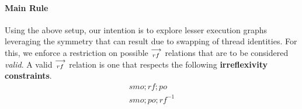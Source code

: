     \paragraph{Main Rule}
        Using the above setup, our intention is to explore lesser execution graphs leveraging the symmetry that can result due to swapping of thread identities. For this, we enforce a restriction on possible $\stackrel{\longrightarrow}{_{rf}}$ relations that are to be considered \emph{valid}. A valid $\stackrel{\longrightarrow}{_{rf}}$ relation is one that respects the following \textbf{irreflexivity constraints}. 
        \begin{align*}
            smo;rf;po \\
            smo;po;rf^{-1} 
        \end{align*}



        

